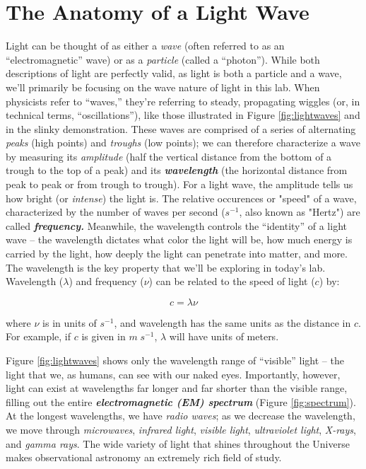 \documentclass[11pt]{article}
\begin{document}
\section{The Anatomy of a Light Wave}
Light can be thought of as either a \emph{wave} (often referred to as an ``electromagnetic'' wave) or as a \emph{particle} (called a ``photon''). While both descriptions of light are perfectly valid, as light is both a particle and a wave, we'll primarily be focusing on the wave nature of light in this lab. When physicists refer to ``waves,'' they're referring to steady, propagating wiggles (or, in technical terms, ``oscillations''), like those illustrated in Figure \ref{fig:lightwaves} and in the slinky demonstration. These waves are comprised of a series of alternating \emph{peaks} (high points) and \emph{troughs} (low points); we can therefore characterize a wave by measuring its \emph{amplitude} (half the vertical distance from the bottom of a trough to the top of a peak) and its \textbf{\emph{wavelength}} (the horizontal distance from peak to peak or from trough to trough). For a light wave, the amplitude tells us how bright (or \emph{intense}) the light is. The relative occurences or "speed" of a wave, characterized by the number of waves per second ($s^{-1}$, also known as "Hertz") are called \textbf{\emph{frequency.}} Meanwhile, the wavelength controls the ``identity'' of a light wave -- the wavelength dictates what color the light will be, how much energy is carried by the light, how deeply the light can penetrate into matter, and more. The wavelength is the key property that we'll be exploring in today's lab. Wavelength ($\lambda$) and frequency ($\nu$) can be related to the speed of light ($c$) by:

\begin{equation}
    c = \lambda \nu
\end{equation}

where $\nu$ is in units of $s^{-1}$, and wavelength has the same units as the distance in $c$. For example, if $c$ is given in $m \; s^{-1}$, $\lambda$ will have units of meters. 

\medskip \noindent
Figure \ref{fig:lightwaves} shows only the wavelength range of ``visible'' light -- the light that we, as humans, can see with our naked eyes. Importantly, however, light can exist at wavelengths far longer and far shorter than the visible range, filling out the entire \emph{\textbf{electromagnetic (EM) spectrum}} (Figure \ref{fig:spectrum}). At the longest wavelengths, we have \emph{radio waves}; as we decrease the wavelength, we move through \emph{microwaves}, \emph{infrared light}, \emph{visible light}, \emph{ultraviolet light}, \emph{X-rays}, and \emph{gamma rays}. The wide variety of light that shines throughout the Universe makes observational astronomy an extremely rich field of study. 
\end{document}
